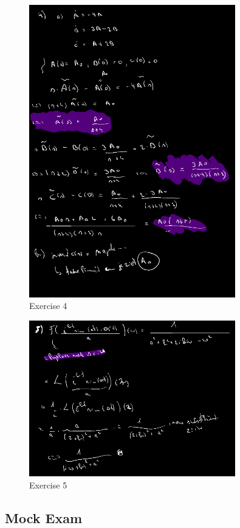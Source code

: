 \documentclass[a4paper]{report}
\begin{document}
\begin{figure}[H]
	\centering
	\includegraphics[width=0.8\textwidth]{assets/bord_12_ex_3.png}
	\caption{Exercise 4}
	\label{fig:bord_12_ex_4}
\end{figure}



\begin{figure}[H]
	\centering
	\includegraphics[width=0.8\textwidth]{assets/bord_12_ex_5.png}
	\caption{Exercise 5}
	\label{fig:bord_12_ex_5}
\end{figure}

\subsection*{Mock Exam}


\end{document}
